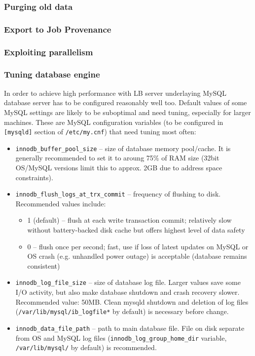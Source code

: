 \subsubsection{Purging old data}
\label{inst:purge}


\subsubsection{Export to Job Provenance}


\subsubsection{Exploiting parallelism}

\subsubsection{Tuning database engine}
\label{inst:db_tuning}

In order to achieve high performance with LB server underlaying MySQL 
database server has to be configured reasonably well too. 
Default values of some MySQL settings are likely to be suboptimal
and need tuning, especially for larger machines.
These are MySQL configuration variables (to be configured in \texttt{[mysqld]} 
section of \texttt{/etc/my.cnf}) that need tuning most often:
\begin{itemize}
\item \texttt{innodb\_buffer\_pool\_size} -- size of database memory pool/cache. 
It is generally recommended to set it to aroung 75\% of RAM size
(32bit OS/MySQL versions limit this to approx. 2GB due to address space 
constraints).

\item \texttt{innodb\_flush\_logs\_at\_trx\_commit} -- frequency of flushing to disk.
Recommended values include:
\begin{itemize}
\item 1 (default) -- flush at each write transaction commit; relatively
slow without battery-backed disk cache but offers highest level of data safety
\item 0 -- flush once per second; fast, use if loss of latest updates on MySQL
or OS crash (e.g. unhandled power outage) is acceptable (database remains consistent)
\end{itemize}

\item \texttt{innodb\_log\_file\_size} -- size of database log file. Larger values
save some I/O activity, but also make database shutdown and crash recovery slower.
Recommended value: 50MB. Clean mysqld shutdown and deletion of log files 
(\texttt{/var/lib/mysql/ib\_logfile*} by default) is necessary before change.

\item \texttt{innodb\_data\_file\_path} -- path to main database file. File on
disk separate from OS and MySQL log files (\texttt{innodb\_log\_group\_home\_dir} variable,
\texttt{/var/lib/mysql/} by default) is recommended.

\end{itemize}

